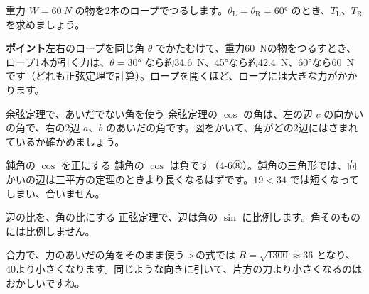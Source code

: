 \begin{jibun}
重力 $W=\qty{60}{N}$ の物を2本のロープでつるします。$\theta_{\mathrm{L}}=\theta_{\mathrm{R}}=\ang{60}$ のとき、$T_{\mathrm{L}}$、$T_{\mathrm{R}}$ を求めましょう。
\end{jibun}
\textbf{ポイント}\quad 左右のロープを同じ角 $\theta$ でかたむけて、重力\qty{60}{N}の物をつるすとき、ロープ1本が引く力は、$\theta=\ang{30}$ なら約\qty{34.6}{N}、\ang{45}なら約\qty{42.4}{N}、\ang{60}なら\qty{60}{N}です（どれも正弦定理で計算）。ロープを開くほど、ロープには大きな力がかかります。


\begin{tsumazuki}{余弦定理で、あいだでない角を使う}
余弦定理の $\cos$ の角は、左の辺 $c$ の向かいの角で、右の2辺 $a$、$b$ のあいだの角です。図をかいて、角がどの2辺にはさまれているか確かめましょう。
\end{tsumazuki}

\begin{tsumazuki}{鈍角の $\cos$ を正にする}
鈍角の $\cos$ は負です（4-6⑧）。鈍角の三角形では、向かいの辺は三平方の定理のときより長くなるはずです。$19<34$ では短くなってしまい、合いません。
\end{tsumazuki}

\begin{tsumazuki}{辺の比を、角の比にする}
正弦定理で、辺は角の $\sin$ に比例します。角そのものには比例しません。
\end{tsumazuki}

\begin{tsumazuki}{合力で、力のあいだの角をそのまま使う}
×の式では $R=\sqrt{1300}\approx36$ となり、40より小さくなります。同じような向きに引いて、片方の力より小さくなるのはおかしいですね。
\end{tsumazuki}

